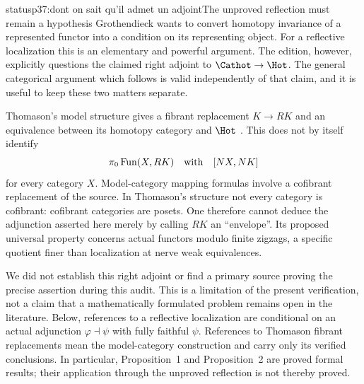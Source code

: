 \begin{dcomment}{status}{p37:dont on sait qu'il admet un adjoint}{The unproved reflection must remain a hypothesis}
Grothendieck wants to convert homotopy invariance of a represented functor into a condition on its representing object. For a reflective localization this is an elementary and powerful argument. The edition, however, explicitly questions the claimed right adjoint to $\Cathot\to\Hot$. The general categorical argument which follows is valid independently of that claim, and it is useful to keep these two matters separate.

Thomason's model structure gives a fibrant replacement $K\to RK$ and an equivalence between its homotopy category and $\Hot$ \citep[Theorem~4.9 and Corollary~5.5]{Thomason1980}. This does not by itself identify
\[
 \pi_0\operatorname{Fun}(X,RK)
       \quad\hbox{with}\quad [NX,NK]
\]
for every category $X$. Model-category mapping formulas involve a cofibrant replacement of the source. In Thomason's structure not every category is cofibrant: cofibrant categories are posets. One therefore cannot deduce the adjunction asserted here merely by calling $RK$ an ``envelope''. Its proposed universal property concerns actual functors modulo finite zigzags, a specific quotient finer than localization at nerve weak equivalences.

We did not establish this right adjoint or find a primary source proving the precise assertion during this audit. This is a limitation of the present verification, not a claim that a mathematically formulated problem remains open in the literature. Below, references to a reflective localization are conditional on an actual adjunction $\varphi\dashv\psi$ with fully faithful $\psi$. References to Thomason fibrant replacements mean the model-category construction and carry only its verified conclusions. In particular, Proposition~1 and Proposition~2 are proved formal results; their application through the unproved reflection is not thereby proved.
\end{dcomment}

